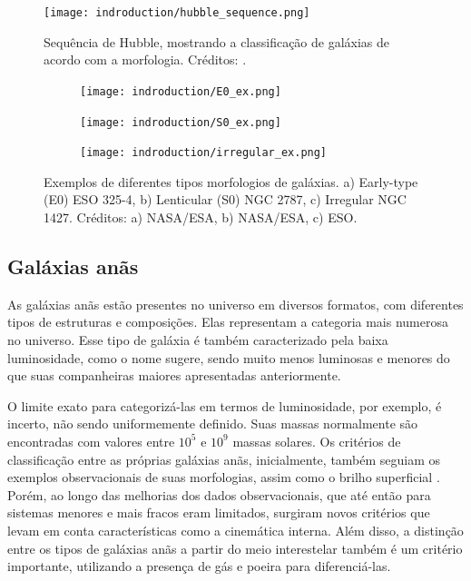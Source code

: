 \begin{figure}[!ht]
    \begin{center}
    \texttt{[image: indroduction/hubble\_sequence.png]}
    \caption[]{Sequência de Hubble, mostrando a classificação de galáxias de acordo com a morfologia. Créditos: \cite{huble_sequence_img}.}
    \label{hubble_sequence}
    \end{center}
\end{figure}


\begin{figure}[!ht]
    \centering
    \captionsetup{justification=centering}
    \begin{subfigure}[b]{0.237\textwidth}
        \texttt{[image: indroduction/E0\_ex.png]}
        \caption{}
    \end{subfigure}
    \begin{subfigure}[b]{0.26\textwidth}
        \texttt{[image: indroduction/S0\_ex.png]}
        \caption{}
    \end{subfigure}
    \begin{subfigure}[b]{0.268\textwidth}
        \texttt{[image: indroduction/irregular\_ex.png]}
        \caption{}
    \end{subfigure}
    \caption{Exemplos de diferentes tipos morfologios de galáxias. a) Early-type (E0) ESO 325-4, b) Lenticular (S0) NGC 2787, c) Irregular NGC 1427. Créditos: a) NASA/ESA, b) NASA/ESA, c) ESO.}
    \label{galaxies_morphology}
\end{figure}

\subsection{Galáxias anãs}\label{subsec:}
As galáxias anãs estão presentes no universo em diversos formatos, com diferentes tipos de estruturas e composições. Elas representam a categoria mais numerosa no universo. Esse tipo de galáxia é também caracterizado pela baixa luminosidade, como o nome sugere, sendo muito menos luminosas e menores do que suas companheiras maiores apresentadas anteriormente.

O limite exato para categorizá-las em termos de luminosidade, por exemplo, é incerto, não sendo uniformemente definido. Suas massas normalmente são encontradas com valores entre $10^5$ e $10^9$ massas solares. Os critérios de classificação entre as próprias galáxias anãs, inicialmente, também seguiam os exemplos observacionais de suas morfologias, assim como o brilho superficial \citep{dwarf_classification_init}. Porém, ao longo das melhorias dos dados observacionais, que até então para sistemas menores e mais fracos eram limitados, surgiram novos critérios que levam em conta características como a cinemática interna. Além disso, a distinção entre os tipos de galáxias anãs a partir do meio interestelar também é um critério importante, utilizando a presença de gás e poeira para diferenciá-las.

